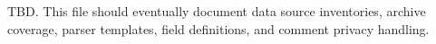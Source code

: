 TBD. This file should eventually document data source inventories, archive coverage, parser templates, field definitions, and comment privacy handling.
